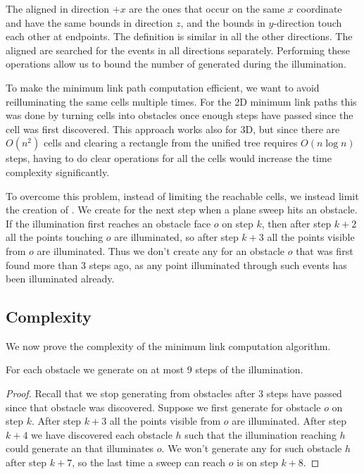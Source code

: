 \documentclass[english,gradu]{tktltiki2018}
\begin{document}
The aligned \addEs in direction $+x$ are the ones that occur on the same $x$ coordinate and have the same bounds in direction $z$, and the bounds in $y$-direction touch each other at endpoints.
The definition is similar in all the other directions.
The aligned \addEs are searched for the events in all directions separately.
Performing these operations allow us to bound the number of \addEs generated during the illumination.

To make the minimum link path computation efficient, we want to avoid reilluminating the same cells multiple times.
For the 2D minimum link paths this was done by turning cells into obstacles once enough steps have passed since the cell was first discovered.
This approach works also for 3D, but since there are $O(n^2)$ cells and clearing a rectangle from the unified tree requires $O(n\log n)$ steps, having to do clear operations for all the cells would increase the time complexity significantly.

To overcome this problem, instead of limiting the reachable cells, we instead limit the creation of \addEs.
We create \addEs for the next step when a plane sweep hits an obstacle.
If the illumination first reaches an obstacle face $o$ on step $k$, then after step $k+2$ all the points touching $o$ are illuminated, so after step $k+3$ all the points visible from $o$ are illuminated.
Thus we don't create any \addEs for an obstacle $o$ that was first found more than 3 steps ago, as any point illuminated through such events has been illuminated already.

\subsection{Complexity}

We now prove the complexity of the minimum link computation algorithm.

\begin{lem}\label{lem:obse3}For each obstacle we generate \obsE on at most 9 steps of the illumination.\end{lem}
\begin{proof}
Recall that we stop generating \addEs from obstacles after 3 steps have passed since that obstacle was discovered.
Suppose we first generate \obsE for obstacle $o$ on step $k$.
After step $k+3$ all the points visible from $o$ are illuminated.
After step $k+4$ we have discovered each obstacle $h$ such that the illumination reaching $h$ could generate an \addE that illuminates $o$.
We won't generate any \addEs for such obstacle $h$ after step $k+7$, so the last time a sweep can reach $o$ is on step $k+8$.
\end{proof}
\end{document}
